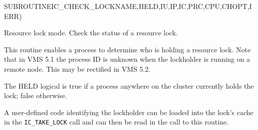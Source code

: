 \begin{routine} %
\subroutine
   {SUBROUTINE}{IC\_CHECK\_LOCK}{NAME,HELD,IU,IP,IC,PRC,CPU,CHOPT,IERR)}
\begin{overview}
Resource lock mode. Check the status of a resource lock.

\end{overview}
\begin{argdeflist}
\end{argdeflist}
\begin{describe}

This routine enables a process to determine who is holding a resource lock.
Note that in VMS 5.1 the process ID is unknown when the lockholder is
running on a remote node. This may be rectified in VMS 5.2.

The HELD logical is true if a process anywhere on the cluster currently
holds the lock; false otherwise.

A user-defined code identifying the lockholder can be loaded into the
lock's cache in the \verb|IC_TAKE_LOCK| call and can then be read in
the call to this routine.

\end{describe}
\begin{options}
\end{options}
\begin{returncodes}
\end{returncodes}
\end{routine}

